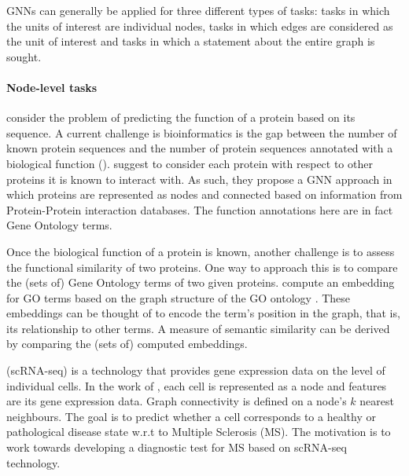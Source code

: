 \documentclass[
	fontsize=10pt, %
	twoside=true, %
	secnumdepth=1, %
  toc=indentunnumbered %
]{kaobook}
\begin{document}
GNNs can generally be applied for three different types of tasks:
 tasks in which the units of interest are individual nodes,
 tasks in which edges are considered as the unit of interest and
 tasks in which a statement about the entire graph is sought.

\paragraph{Node-level tasks}
\citeauthor{you_DeepGraphGOGraphNeural_2021}
\cite{you_DeepGraphGOGraphNeural_2021} consider the problem of predicting the
function of a protein based on its sequence. A current challenge is
bioinformatics is the gap between the number of known protein sequences and the
number of protein sequences annotated with a biological function
(). \citeauthor{you_DeepGraphGOGraphNeural_2021}
suggest to consider each protein with respect to other proteins it is known to
interact with. As such, they propose a GNN approach in which proteins are
represented as nodes and connected based on information from Protein-Protein
interaction databases. The function annotations here are in fact Gene Ontology
terms.

Once the biological function of a protein is known, another challenge is to assess the
functional similarity of two proteins. One way to approach this is to compare
the (sets of) Gene Ontology terms of two given proteins. 
\citeauthor{zhong_GO2VecTransformingGO_2020} compute an embedding for GO terms
based on the graph structure of the GO ontology
\cite{zhong_GO2VecTransformingGO_2020}.
These embeddings can be thought
of to encode the term's position in the graph, that is, its relationship to
other terms. A measure of semantic similarity can be derived by comparing the
(sets of) computed embeddings.

 (scRNA-seq) is a technology that provides gene
expression data on the level of individual cells. In the work of
\citeauthor{ravindra_disease_2020} \cite{ravindra_disease_2020}, each cell is
represented as a node and features are its gene expression data. Graph
connectivity is defined on a node's $k$ nearest neighbours. The goal is to
predict whether a cell corresponds to a healthy or pathological disease state
w.r.t to Multiple Sclerosis (MS). The motivation is to work towards developing a
diagnostic test for MS based on scRNA-seq technology.
\end{document}
